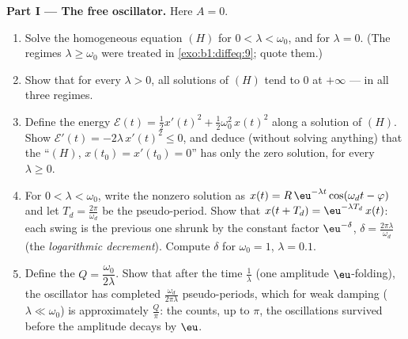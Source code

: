\begin{problem}
\medskip
\noindent\textbf{Part I --- The free oscillator.} Here $A = 0$.
\begin{enumerate}
  \item Solve the homogeneous equation $(H)$ for $0 < \lambda <
        \omega_0$, and for $\lambda = 0$. (The regimes $\lambda
        \geq \omega_0$ were treated in \cref{exo:b1:diffeq:9};
        quote them.)
  \item Show that for every $\lambda > 0$, all solutions of $(H)$
        tend to $0$ at $+\infty$ --- in all three regimes.
  \item Define the energy $\mathcal E(t) = \frac12 x'(t)^2 +
        \frac12\omega_0^2\,x(t)^2$ along a solution of $(H)$. Show
        $\mathcal E'(t) = -2\lambda\,x'(t)^2 \leq 0$, and deduce
        (without solving anything) that the 
        ``$(H)$, $x(t_0) = x'(t_0) = 0$'' has only the zero
        solution, for every $\lambda \geq 0$.
  \item For $0 < \lambda < \omega_0$, write the nonzero solution as
        $x(t) = R\,\eu^{-\lambda t}\cos(\omega_d t - \varphi)$ and
        let $T_d = \frac{2\pi}{\omega_d}$ be the pseudo-period.
        Show that $x(t + T_d) = \eu^{-\lambda T_d}\,x(t)$: each
        swing is the previous one shrunk by the constant factor
        $\eu^{-\delta}$, $\delta = \frac{2\pi\lambda}{\omega_d}$
        (the \emph{logarithmic decrement}). Compute $\delta$ for
        $\omega_0 = 1$, $\lambda = 0.1$.
  \item Define the \emph{} $Q =
        \dfrac{\omega_0}{2\lambda}$. Show
        that after the time $\frac1\lambda$ (one amplitude
        $\eu$-folding), the oscillator has completed
        $\frac{\omega_d}{2\pi\lambda}$ pseudo-periods, which for
        weak damping ($\lambda \ll \omega_0$) is approximately
        $\frac Q\pi$: the  counts, up to $\pi$, the
        oscillations survived before the amplitude decays by
        $\eu$.
\end{enumerate}


\end{problem}
